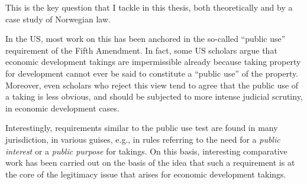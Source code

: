 \documentclass{book} %
\newcommand{\noo}[1]{}
\begin{document}
This is the key question that I tackle in this thesis, both theoretically and by a case study of Norwegian law. 
\noo{ Later in this thesis, I will devote much attention to this question. First I will do so from a theoretical point of view, by first arguing that the category of economic development takings arises naturally already at the theoretical level, provided one chooses a suitable theoretical framework for reasoning about takings and property. Following up on this, I set out to distil some general lessons from the US debate and its history. In addition, I briefly assess the status of economic development takings in Europe, where takings that benefit commercial interests are often allowed to pass without raising special questions, and where the legal relevance of the category of economic development takings may still be called into doubt.

In fact, I argue that this is a shortcoming of the narrative of property protection in Europe, and I also suggest that the concept of an economic development taking would in fact fit well with jurisprudential developments at the ECtHR, which stresses both the need for contextual assessment and attention to possible systemic imbalances in the expropriation practices of member states.

}
In the US, most work on this has been anchored in the so-called ``public use'' requirement of the Fifth Amendment. In fact, some US scholars argue that economic development takings are impermissible already because taking property for development cannot ever be said to constitute a ``public use'' of the property. Moreover, even scholars who reject this view tend to agree that the public use of a taking is less obvious, and should be subjected to more intense judicial scrutiny, in economic development cases.

Interestingly, requirements similar to the public use test are found in many jurisdiction, in various guises, e.g., in rules referring to the need for a {\it public interest} or a {\it public purpose} for takings. On this basis, interesting comparative work has been carried out on the basis of the idea that such a requirement is at the core of the legitimacy issue that arises for economic development takings.
\end{document}
